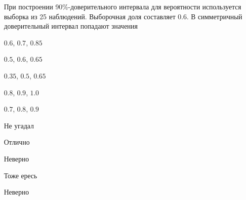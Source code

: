 
\begin{question}
При построении 90\%-доверительного интервала для вероятности
используется выборка из 25 наблюдений. Выборочная доля составляет 0.6. В
симметричный доверительный интервал попадают значения
\begin{answerlist}
  \item \(0.6\), \(0.7\), \(0.85\)
  \item \(0.5\), \(0.6\), \(0.65\)
  \item \(0.35\), \(0.5\), \(0.65\)
  \item \(0.8\), \(0.9\), \(1.0\)
  \item \(0.7\), \(0.8\), \(0.9\)
\end{answerlist}
\end{question}

\begin{solution}
\begin{answerlist}
  \item Не угадал
  \item Отлично
  \item Неверно
  \item Тоже ересь
  \item Неверно
\end{answerlist}
\end{solution}

